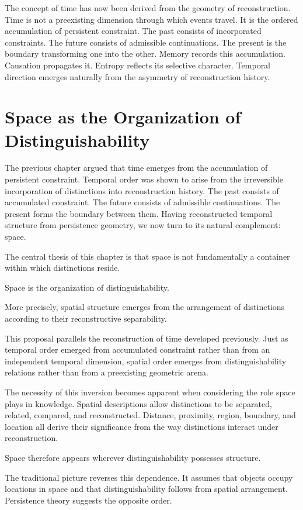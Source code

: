 \documentclass[12pt,oneside]{article}
\theoremstyle{definition}
\begin{document}
The concept of time has now been derived from the geometry of reconstruction. Time is not a preexisting dimension through which events travel. It is the ordered accumulation of persistent constraint. The past consists of incorporated constraints. The future consists of admissible continuations. The present is the boundary transforming one into the other. Memory records this accumulation. Causation propagates it. Entropy reflects its selective character. Temporal direction emerges naturally from the asymmetry of reconstruction history.

\section{Space as the Organization of Distinguishability}

The previous chapter argued that time emerges from the accumulation of persistent constraint. Temporal order was shown to arise from the irreversible incorporation of distinctions into reconstruction history. The past consists of accumulated constraint. The future consists of admissible continuations. The present forms the boundary between them. Having reconstructed temporal structure from persistence geometry, we now turn to its natural complement: space.

The central thesis of this chapter is that space is not fundamentally a container within which distinctions reside.

Space is the organization of distinguishability.

More precisely, spatial structure emerges from the arrangement of distinctions according to their reconstructive separability.

This proposal parallels the reconstruction of time developed previously. Just as temporal order emerged from accumulated constraint rather than from an independent temporal dimension, spatial order emerges from distinguishability relations rather than from a preexisting geometric arena.

The necessity of this inversion becomes apparent when considering the role space plays in knowledge. Spatial descriptions allow distinctions to be separated, related, compared, and reconstructed. Distance, proximity, region, boundary, and location all derive their significance from the way distinctions interact under reconstruction.

Space therefore appears wherever distinguishability possesses structure.

The traditional picture reverses this dependence. It assumes that objects occupy locations in space and that distinguishability follows from spatial arrangement. Persistence theory suggests the opposite order.
\end{document}
